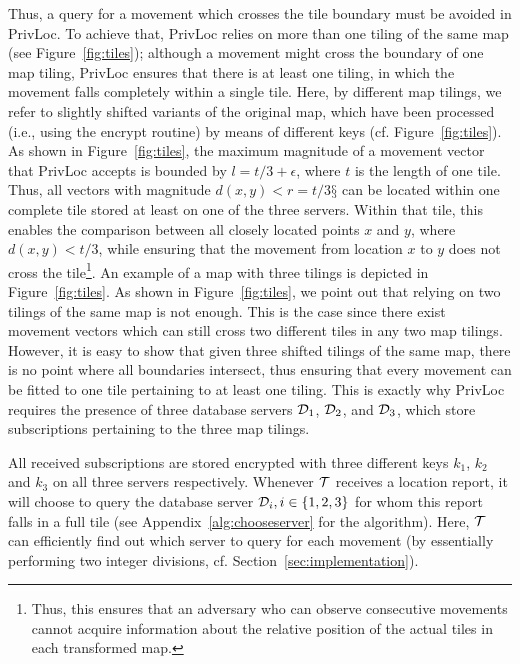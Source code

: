 \documentclass{llncs}
\newcommand\sol{{\sf PrivLoc}}
\begin{document}
Thus, a query for a movement which crosses the tile boundary must be avoided in \sol. To achieve that, \sol{} relies on more than one tiling of the same map (see Figure~\ref{fig:tiles}); although a movement
might cross the boundary of one map tiling, \sol{} ensures that there is at least one tiling, in which the movement falls completely within a single tile. Here, by different map tilings, we refer to slightly shifted variants of the original map, which
have been processed (i.e., using the {\sf encrypt} routine) by means of different keys (cf. Figure~\ref{fig:tiles}). As shown in Figure~\ref{fig:tiles}, the maximum
magnitude of a movement vector that \sol{} accepts is bounded by $l=t/3+\epsilon$, where $t$ is the length of one tile. Thus, all vectors with magnitude $d(x,y)<r=t/3§$ can be located within one complete tile stored at least on
one of the three servers. Within that tile, this enables the comparison between all closely located points $x$ and $y$, where $d(x,y)<t/3$, while ensuring that
the movement from location $x$ to $y$ does not cross the tile\footnote{Thus, this ensures that an adversary who can observe consecutive movements cannot acquire information about the relative position of the actual tiles in each transformed map.}.
An example of a map with three tilings is depicted in Figure~\ref{fig:tiles}. As shown in Figure~\ref{fig:tiles}, we point out that relying on two tilings of the same map is not enough. This is the case since there exist
movement vectors which can still cross two different tiles in any two map tilings. However, it is easy to show that given three shifted tilings of the same map, there is no point where all boundaries intersect, thus ensuring that every movement
can be fitted to one tile pertaining to at least one tiling. This is exactly why \sol{} requires the presence of three database servers ${\cal D}_1$, ${\cal D}_2$, and ${\cal D}_3$, which store subscriptions pertaining to the three map tilings.

All received subscriptions are
stored encrypted with three different keys $k_1$, $k_2$ and $k_3$ on all three servers respectively.  Whenever $\cal T$ receives a location report, it will choose to query the database server ${\cal D}_i, i \in \{1,2,3\}$ for whom
this report falls in a full tile (see Appendix~\ref{alg:chooseserver} for the algorithm).
Here, $\cal T$ can efficiently find out which server to query for each movement (by essentially performing two integer divisions, cf. Section~\ref{sec:implementation}).
\end{document}

